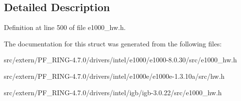 \subsection{Detailed Description}


Definition at line 500 of file e1000\_\-hw.h.



The documentation for this struct was generated from the following files:\begin{DoxyCompactItemize}
\item 
src/extern/PF\_\-RING-\/4.7.0/drivers/intel/e1000/e1000-\/8.0.30/src/e1000\_\-hw.h\item 
src/extern/PF\_\-RING-\/4.7.0/drivers/intel/e1000e/e1000e-\/1.3.10a/src/hw.h\item 
src/extern/PF\_\-RING-\/4.7.0/drivers/intel/igb/igb-\/3.0.22/src/e1000\_\-hw.h\end{DoxyCompactItemize}
